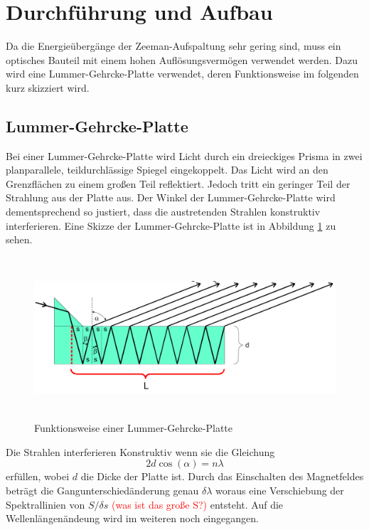 \section{Durchführung und Aufbau}
\label{sec:Durchführung}
Da die Energieübergänge der Zeeman-Aufspaltung sehr gering sind, muss ein optisches Bauteil mit einem hohen Auflösungsvermögen verwendet werden. Dazu wird eine Lummer-Gehrcke-Platte verwendet, deren Funktionsweise im folgenden kurz skizziert wird.

\subsection{Lummer-Gehrcke-Platte}
Bei einer Lummer-Gehrcke-Platte wird Licht durch ein dreieckiges Prisma in zwei planparallele, teildurchlässige Spiegel eingekoppelt. Das Licht wird an den Grenzflächen zu einem großen Teil reflektiert. Jedoch tritt ein geringer Teil der Strahlung aus der Platte aus. Der Winkel der Lummer-Gehrcke-Platte wird dementsprechend so justiert, dass die austretenden Strahlen konstruktiv interferieren. Eine Skizze der Lummer-Gehrcke-Platte ist in Abbildung \ref{fig:Lum} zu sehen.

\begin{figure}[H]
  \centering
  \includegraphics[height=6cm]{Bilder/Lummer.png}
  \caption{Funktionsweise einer Lummer-Gehrcke-Platte \cite{V27}}
  \label{fig:Lum}
\end{figure}

Die Strahlen interferieren Konstruktiv wenn sie die Gleichung
\begin{equation}
  2 d \cos(\alpha) = n \lambda
\end{equation}
erfüllen, wobei $d$ die Dicke der Platte ist. Durch das Einschalten des Magnetfeldes beträgt die Gangunterschiedänderung genau $\delta \lambda$ woraus eine Verschiebung der Spektrallinien von $S/\delta s$ \textcolor{red}{(was ist das große S?)} entsteht. Auf die Wellenlängenändeung wird im weiteren noch eingegangen.

